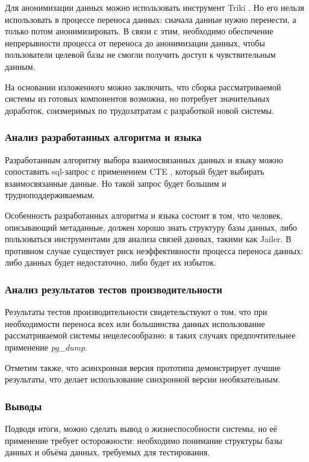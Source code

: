 Для анонимизации данных можно использовать инструмент Triki \cite{triki}. Но его нельзя использовать в процессе переноса данных: сначала данные нужно перенести, а только потом анонимизировать. В связи с этим, необходимо обеспечение непрерывности процесса от переноса до анонимизации данных, чтобы пользователи целевой базы не смогли получить доступ к чувствительным данным.

На основании изложенного можно заключить, что сборка рассматриваемой системы из готовых компонентов возможна, но потребует значительных доработок, соизмеримых по трудозатратам с разработкой новой системы.

\subsubsection{Анализ разработанных алгоритма и языка}

Разработанным алгоритму выбора взаимосвязанных данных и языку можно сопоставить sql-запрос с применением CTE \cite{pg-cte}, который будет выбирать взаимосвязанные данные. Но такой запрос будет большим и трудноподдерживаемым.

Особенность разработанных алгоритма и языка состоит в том, что человек, описывающий метаданные, должен хорошо знать структуру базы данных, либо пользоваться инструментами для анализа связей данных, такими как Jailer. В противном случае существует риск неэффективности процесса переноса данных: либо данных будет недостаточно, либо будет их избыток.

\subsubsection{Анализ результатов тестов производительности}

Результаты тестов производительности свидетельствуют о том, что при необходимости переноса всех или большинства данных использование рассматриваемой системы нецелесообразно: в таких случаях предпочтительнее применение \textit{pg\_dump}.

Отметим также, что асинхронная версия прототипа демонстрирует лучшие результаты, что делает использование синхронной версии необязательным.

\subsubsection{Выводы}

Подводя итоги, можно сделать вывод о жизнеспособности системы, но её применение требует осторожности: необходимо понимание структуры базы данных и объёма данных, требуемых для тестирования.
